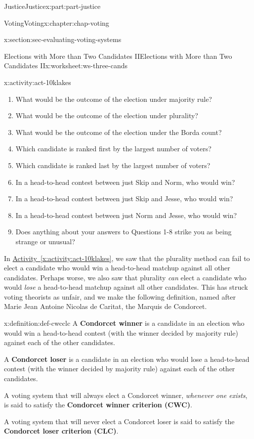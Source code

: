 \documentclass[oneside,10pt,]{book}
\newcommand{\xreffont}{\relax}
\newcommand{\terminology}[1]{\textbf{#1}}
\numberwithin{equation}{section}
\begin{document}
\begin{partptx}{Justice}{}{Justice}{}{}{x:part:part-justice}
\begin{chapterptx}{Voting}{}{Voting}{}{}{x:chapter:chap-voting}
\begin{sectionptx}{}{}{}{}{}{x:section:sec-evaluating-voting-systems}
\begin{worksheet-subsection}{Elections with More than Two Candidates II}{}{Elections with More than Two Candidates II}{}{}{x:worksheet:ws-three-cands}
\begin{activity}{}{x:activity:act-10klakes}
\begin{enumerate}[label=(\alph*)]
\item{}What would be the outcome of the election under majority rule?%
\item{}What would be the outcome of the election under plurality?%
\item{}What would be the outcome of the election under the Borda count?%
\item{}Which candidate is ranked first by the largest number of voters?%
\item{}Which candidate is ranked last by the largest number of voters?%
\item{}In a head-to-head contest between just Skip and Norm, who would win?%
\item{}In a head-to-head contest between just Skip and Jesse, who would win?%
\item{}In a head-to-head contest between just Norm and Jesse, who would win?%
\item{}Does anything about your answers to Questions 1-8 strike you as being strange or unusual?%
\end{enumerate}
\end{activity}%
In \hyperref[x:activity:act-10klakes]{Activity~{\xreffont\ref{x:activity:act-10klakes}}}, we saw that the plurality method can fail to elect a candidate who would win a head-to-head matchup against all other candidates. Perhaps worse, we also saw that plurality \emph{can} elect a candidate who would \emph{lose} a head-to-head matchup against all other candidates. This has struck voting theorists as unfair, and we make the following definition, named after Marie Jean Antoine Nicolas de Caritat, the Marquis de Condorcet.%
\begin{definition}{}{x:definition:def-cwcclc}%
A \terminology{Condorcet winner} is a candidate in an election who would win a head-to-head contest (with the winner decided by majority rule) against each of the other candidates.%
\par
A \terminology{Condorcet loser} is a candidate in an election who would lose a head-to-head contest (with the winner decided by majority rule) against each of the other candidates.%
\par
A voting system that will always elect a Condorcet winner, \emph{whenever one exists}, is said to satisfy the \terminology{Condorcet winner criterion (CWC)}.%
\par
A voting system that will never elect a Condorcet loser is said to satisfy the \terminology{Condorcet loser criterion (CLC)}.%
\end{definition}

\end{worksheet-subsection}
\end{sectionptx}
\end{chapterptx}
\end{partptx}
\end{document}
